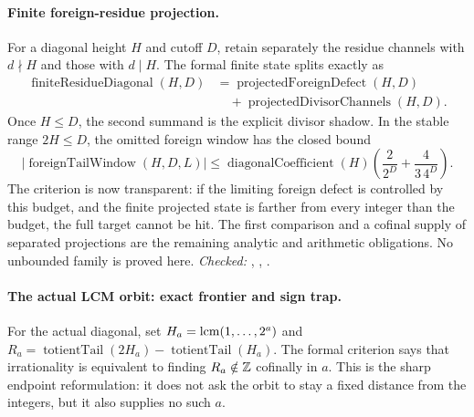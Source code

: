 \documentclass[11pt]{article}
\begin{document}
\paragraph{Finite foreign-residue projection.}
For a diagonal height $H$ and cutoff $D$, retain separately the residue
channels with $d\nmid H$ and those with $d\mid H$.  The formal finite state
splits exactly as
\[
 \begin{aligned}
 \operatorname{finiteResidueDiagonal}(H,D)
   &=\operatorname{projectedForeignDefect}(H,D)\\
   &\quad+\operatorname{projectedDivisorChannels}(H,D).
 \end{aligned}
\]
Once $H\le D$, the second summand is the explicit divisor shadow.  In the
stable range $2H\le D$, the omitted foreign window has the closed bound
\[
 \left|\operatorname{foreignTailWindow}(H,D,L)\right|
 \le \operatorname{diagonalCoefficient}(H)\left(
       \frac{2}{2^D}+\frac{4}{3\,4^D}\right).
\]
The criterion is now transparent: if the limiting foreign defect is
controlled by this budget, and the finite projected state is farther from
every integer than the budget, the full target cannot be hit.  The first
comparison and a cofinal supply of separated projections are the remaining
analytic and arithmetic obligations.  No unbounded family is proved here.
{\footnotesize\emph{Checked:}
,
,
.}

\paragraph{The actual LCM orbit: exact frontier and sign trap.}
For the actual diagonal, set $H_a=\operatorname{lcm}(1,\ldots,2^a)$ and
$R_a=\operatorname{totientTail}(2H_a)-\operatorname{totientTail}(H_a)$.
The formal criterion
says that irrationality is equivalent to finding $R_a\notin\mathbb{Z}$ cofinally in
$a$.  This is the sharp endpoint reformulation: it does not ask the orbit to
stay a fixed distance from the integers, but it also supplies no such $a$.
\end{document}
